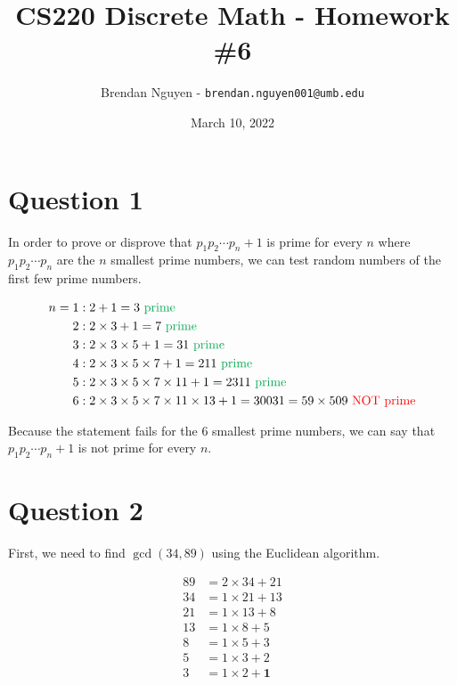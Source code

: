 \documentclass[11pt]{article}
\title{CS220 Discrete Math - Homework \#6}
\author{Brendan Nguyen - \texttt{brendan.nguyen001@umb.edu}}
\date{March 10, 2022}
\begin{document}
\maketitle

\section*{Question 1}
In order to prove or disprove that $p_{1}p_{2} \cdots p_n + 1$ is prime for every $n$ where $p_{1}p_{2} \cdots p_n$ are the $n$ smallest prime numbers, we can test random numbers of the first few prime numbers.

\begin{align*}
    n = 1 &: 2 + 1 = 3 \text{ \textcolor{Green}{prime}}\\
    2 &: 2 \times 3 + 1 = 7 \text{ \textcolor{Green}{prime}}\\
    3 &: 2 \times 3 \times 5 + 1 = 31 \text{ \textcolor{Green}{prime}}\\
    4 &: 2 \times 3 \times 5 \times 7 + 1 = 211 \text{ \textcolor{Green}{prime}}\\
    5 &: 2 \times 3 \times 5 \times 7 \times 11 + 1 = 2311 \text{ \textcolor{Green}{prime}}\\
    6 &: 2 \times 3 \times 5 \times 7 \times 11 \times 13 + 1 = 30031 = 59 \times 509 \text{ \textcolor{red}{NOT prime}}\\
\end{align*}

Because the statement fails for the 6 smallest prime numbers, we can say that $p_{1}p_{2} \cdots p_n + 1$ is not prime for every $n$.

\section*{Question 2}
First, we need to find $\gcd(34, 89)$ using the Euclidean algorithm.

\begin{align*}
    89 &= 2 \times 34 + 21\\
    34 &= 1 \times 21 + 13\\
    21 &= 1 \times 13 + 8\\
    13 &= 1 \times 8 + 5\\
    8 &= 1 \times 5 + 3\\
    5 &= 1 \times 3 + 2\\
    3 &= 1 \times 2 + \boxed{\mathbf{1}}\\
\end{align*}
\end{document}
